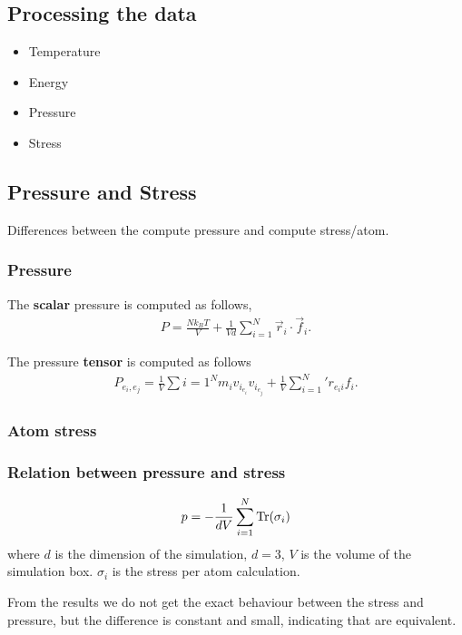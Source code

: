 \documentclass[main.tex]{subfiles}
\begin{document}
\subsection{Processing the data}

\begin{itemize}
    \item Temperature
    \item Energy
    \item Pressure
    \item Stress
\end{itemize}

\subsection{Pressure and Stress}

Differences between the compute pressure and compute stress/atom.

\subsubsection{Pressure}

The \textbf{scalar} pressure is computed as follows,
\begin{gather*}
    P=\frac{Nk_{B}T}{V}+\frac{1}{Vd}\sum_{i=1}^N\vec{r}_i\cdot\vec{f}_i.
\end{gather*}

The pressure \textbf{tensor} is computed as follows
\begin{gather*}
    P_{e_i,e_j}=\frac{1}{V}\sum{i=1}^{N}m_{i}v_{i_{e_i}}v_{i_{e_j}}+\frac{1}{V}\sum_{i=1}^N'r_{e_{i}i}f_{i}.
\end{gather*}



\subsubsection{Atom stress}

\subsubsection{Relation between pressure and stress}

\begin{gather*}
    p=-\frac{1}{dV}\sum_{i=1}^{N}\mathrm{Tr}\qty(\sigma_i)
\end{gather*}
where $d$ is the dimension of the simulation, $d=3$, $V$ is the volume of the simulation box.
$\sigma_i$ is the stress per atom calculation.

From the results we do not get the exact behaviour between the stress and pressure, but the difference is constant and small, indicating that are equivalent.
\end{document}
